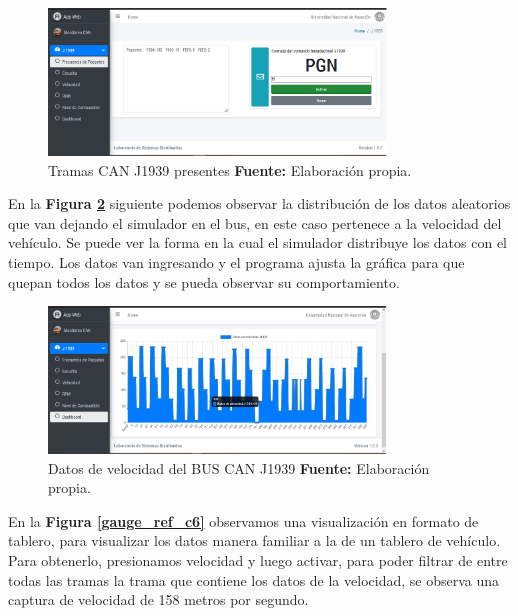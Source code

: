 \begin{figure}[H]
	\centering
	\includegraphics[width=0.8\textwidth]{./Cap6imagen/paquetes_fig_c6.png}
	\caption [Tramas CAN J1939 presentes.]{Tramas CAN J1939 presentes \textbf{ Fuente:} %
		Elaboración propia.}
	\label{paquetes_ref_c6} %
\end{figure}




En la \textbf{Figura \ref{real_ref_c6}} siguiente podemos observar la distribución de los datos aleatorios que van dejando el simulador en el bus, en este caso pertenece a la velocidad  del vehículo. Se puede ver la forma en la cual el simulador distribuye los datos con el tiempo.  Los datos van ingresando y el programa ajusta la gráfica para que quepan todos los datos y se pueda observar su comportamiento.  

\begin{figure}[H]
	\centering
	\includegraphics[width=0.8\textwidth]{./Cap6imagen/real_fig_c6.png}
	\caption [Datos de Velocidad del BUS CAN J1939.]{Datos de velocidad del BUS CAN J1939 \textbf{ Fuente:} %
		Elaboración propia.}
	\label{real_ref_c6} %
\end{figure}


En la \textbf{Figura \ref{gauge_ref_c6}} observamos una visualización en formato de tablero, para visualizar los datos manera familiar a la de un tablero de vehículo. 
Para obtenerlo, presionamos velocidad y luego activar, para poder filtrar de entre todas las tramas la trama que contiene los datos de la velocidad, se observa una captura de velocidad de 158 metros por segundo. 


